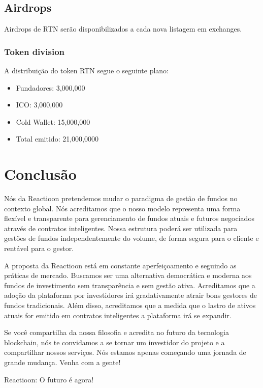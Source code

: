 \documentclass[
	article,			%
	12pt,				%
	oneside,			%
	a4paper,			%
	brazil,				%
	english,
	sumario=tradicional
	]{abntex2}
\begin{document}
\subsection{Airdrops}
Airdrops de RTN serão disponibilizados a cada nova listagem em exchanges.
\subsubsection{Token division}
A distribuição do token RTN segue o seguinte plano:
\begin{itemize}
    \item [] Fundadores: 3,000,000
    
    \item [] ICO: 3,000,000

    \item [] Cold Wallet: 15,000,000

    \item [] Total emitido: 21,000,0000

\end{itemize}

\section{Conclusão}

Nós da Reactioon pretendemos mudar o paradigma de gestão de fundos no contexto global. Nós acreditamos que o nosso modelo representa uma forma flexível e transparente para gerenciamento de fundos atuais e futuros negociados através de contratos inteligentes. Nossa estrutura poderá ser utilizada para gestões de fundos independentemente do volume, de forma segura para o cliente e rentável para o gestor.

A proposta da Reactioon está em constante aperfeiçoamento e seguindo as práticas de mercado. Buscamos ser uma alternativa democrática e moderna aos fundos de investimento sem transparência e sem gestão ativa. Acreditamos que a adoção da plataforma por investidores irá gradativamente atrair bons gestores de fundos tradicionais. Além disso, acreditamos que a medida que o lastro de ativos atuais for emitido em contratos inteligentes a plataforma irá se expandir.

Se você compartilha da nossa filosofia e acredita no futuro da tecnologia blockchain, nós te convidamos a se tornar um investidor do projeto e a compartilhar nossos serviços. Nós estamos apenas começando uma jornada de grande mudança. Venha com a gente!

Reactioon: O futuro é agora!
\end{document}
